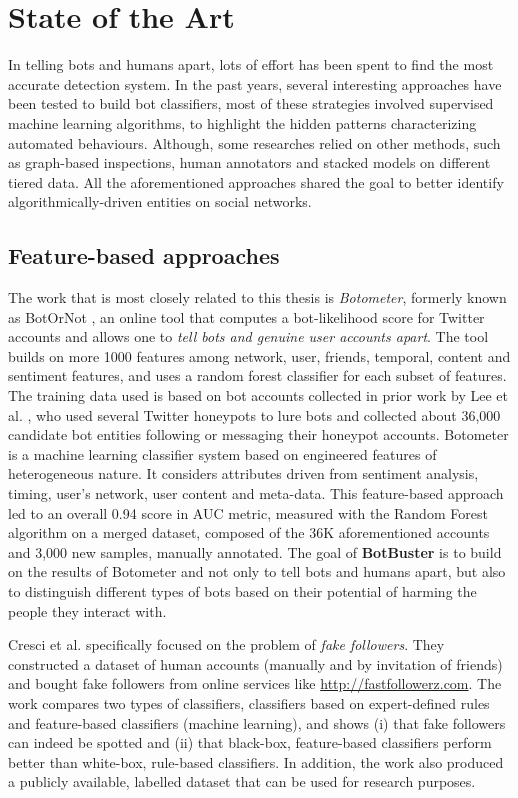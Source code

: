\chapter{State of the Art}
\label{capitolo2}
\thispagestyle{empty}

In telling bots and humans apart, lots of effort has been spent to find the most accurate detection system. In the past years, several interesting approaches have been tested to build bot classifiers, most of these strategies involved supervised machine learning algorithms, to highlight the hidden patterns characterizing automated behaviours. Although, some researches relied on other methods, such as graph-based inspections, human annotators and stacked models on different tiered data. All the aforementioned approaches shared the goal to better identify algorithmically-driven entities on social networks.

\section{Feature-based approaches}
The work that is most closely related to this thesis is\textit{ Botometer}, formerly known as BotOrNot \cite{Botometer, BotorNot}, an online tool that computes a bot-likelihood score for Twitter accounts and allows one to \emph{tell bots and genuine user accounts apart}. The tool builds on more 1000 features among network, user, friends, temporal, content and sentiment features, and uses a random forest classifier for each subset of features. The training data used is based on bot accounts collected in prior work by Lee et al. \cite{lee2011seven}, who used several Twitter honeypots to lure bots and collected about 36,000 candidate bot entities following or messaging their honeypot accounts. 
Botometer is a machine learning classifier system based on engineered features of heterogeneous nature. It considers attributes driven from sentiment analysis, timing, user's network, user content and meta-data. This feature-based approach led to an overall 0.94 score in AUC metric, measured with the Random Forest algorithm on a merged dataset, composed of the 36K aforementioned accounts and 3,000 new samples, manually annotated.
The goal of \textbf{BotBuster} is to build on the results of Botometer and not only to tell bots and humans apart, but also to distinguish different types of bots based on their potential of harming the people they interact with.

Cresci et al. \cite{Fake-Followers} specifically
focused on the problem of \emph{fake followers}. They constructed a dataset of human accounts (manually and by invitation of friends) and bought fake followers from online services like \url{http://fastfollowerz.com}. The work compares two types of classifiers, classifiers based on expert-defined rules and feature-based classifiers (machine learning), and shows (i) that fake followers 
can indeed be spotted and (ii) that black-box, feature-based classifiers perform better than white-box, rule-based classifiers. In addition, the work also produced a publicly available, labelled dataset that can be used for research purposes.

